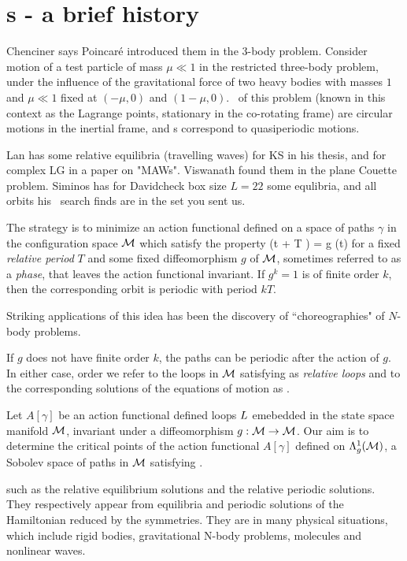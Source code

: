 %


\section{{\Rpo s} - a brief history}

Chenciner
says Poincar\'e introduced them in the 3-body problem.
Consider motion of a test particle of mass
$\mu \ll 1$ in the
restricted three-body problem,
under the
influence of the gravitational force of two heavy bodies with masses $1$ and
$\mu \ll 1$ fixed at $(-\mu,0)$ and $(1-\mu,0)$. \Reqv\ of this problem
(known in this context as the Lagrange points, stationary in
the co-rotating frame) are circular motions in the inertial frame,
and {\rpo s} correspond to quasiperiodic motions. 

Lan has some relative equilibria (travelling waves) for KS in his
thesis, %
 and for complex LG in a paper on "MAWs".
Viswanath %
found them in the plane Couette problem.
Siminos has for Davidcheck box size $L=22$ some equlibria, and all
orbits his \rpo\ search finds are in the set you sent us.


The strategy
is to minimize an action functional defined on a space of paths $\gamma$ in the
configuration space ${\cal M}$ which satisfy the property
\beq
                               \gamma (t + T ) = g \cdot \gamma (t)                       
\label{McC1}
\eeq
for a fixed {\em relative period} $T$ and some fixed diffeomorphism $g$ of ${\cal M}$, 
sometimes referred to as a {\em phase}, that leaves the 
action functional invariant. If $g^k=1$ is of finite order
$k$, then the corresponding orbit is periodic with period $k T$. 

Striking applications of this idea has been the discovery
of ``choreographies" of $N$-body problems.

If $g$ does not have finite order $k$, the
paths can be periodic after the action of $g$. 
In either case, order we refer to the loops
in ${\cal M}$ satisfying  as 
{\em relative loops} and
to the corresponding solutions of the equations of motion
as {\em \rpo}. 

    Let $A[\gamma]$ be an action functional defined loops $L$
emebedded in the state space manifold ${\cal M}$, invariant
under a diffeomorphism $g : {\cal M} \to{\cal M}$. Our aim is to determine
the critical points of the action functional
$ %
	A[\gamma]
$ %
defined on $\Lambda_g^1({\cal M})$, a Sobolev space of paths in ${\cal M}$ satisfying 
.

such as the relative equilibrium solutions and
the relative periodic solutions. They respectively appear from
equilibria and periodic solutions of the Hamiltonian reduced by the symmetries.
They are in many physical situations, which include rigid bodies, gravitational
N-body problems, molecules and nonlinear waves.

